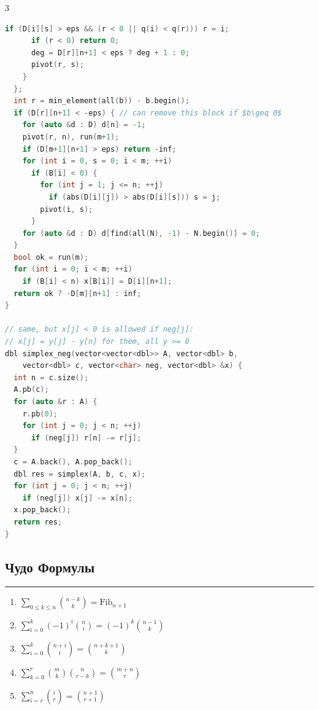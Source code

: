 \documentclass[8pt,a4paper,landscape,twosided]{extarticle}
\begin{document}
\begin{multicols*}{3}
\begin{lstlisting}[language=C++]
        if (D[i][s] > eps && (r < 0 || q(i) < q(r))) r = i;
      if (r < 0) return 0;
      deg = D[r][n+1] < eps ? deg + 1 : 0;
      pivot(r, s);
    }
  };
  int r = min_element(all(b)) - b.begin();
  if (D[r][n+1] < -eps) { // can remove this block if $b\geq 0$
    for (auto &d : D) d[n] = -1;
    pivot(r, n), run(m+1);
    if (D[m+1][n+1] > eps) return -inf;
    for (int i = 0, s = 0; i < m; ++i)
      if (B[i] < 0) {
        for (int j = 1; j <= n; ++j)
          if (abs(D[i][j]) > abs(D[i][s])) s = j;
        pivot(i, s);
      }
    for (auto &d : D) d[find(all(N), -1) - N.begin()] = 0;
  }
  bool ok = run(m);
  for (int i = 0; i < m; ++i)
    if (B[i] < n) x[B[i]] = D[i][n+1];
  return ok ? -D[m][n+1] : inf;
}

// same, but x[j] < 0 is allowed if neg[j]:
// x[j] = y[j] - y[n] for them, all y >= 0
dbl simplex_neg(vector<vector<dbl>> A, vector<dbl> b,
    vector<dbl> c, vector<char> neg, vector<dbl> &x) {
  int n = c.size();
  A.pb(c);
  for (auto &r : A) {
    r.pb(0);
    for (int j = 0; j < n; ++j)
      if (neg[j]) r[n] -= r[j];
  }
  c = A.back(), A.pop_back();
  dbl res = simplex(A, b, c, x);
  for (int j = 0; j < n; ++j)
    if (neg[j]) x[j] -= x[n];
  x.pop_back();
  return res;
}
\end{lstlisting}

\subsection{Чудо Формулы}
\noindent\rule{\linewidth}{0.15mm}

\begingroup
\small

\begin{enumerate}
\item %
$\sum_{0\le k\le n}\binom{n-k}{k}=\mathrm{Fib}_{n+1}$

\item %
$\sum_{i=0}^{k}(-1)^i\binom{n}{i}=(-1)^k\binom{n-1}{k}$

\item %
$\sum_{i=0}^{k}\binom{n+i}{i}=\binom{n+k+1}{k}$

\item %
$\sum_{k=0}^{r}\binom{m}{k}\binom{n}{r-k}=\binom{m+n}{r}$

\item %
$\sum_{i=r}^{n}\binom{i}{r}=\binom{n+1}{r+1}$


\end{enumerate}
\end{multicols*}
\end{document}
